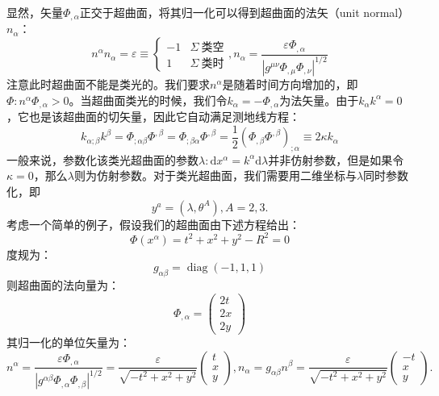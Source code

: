 \documentclass[hyperref, UTF8, a4paper]{ctexart}
\begin{document}
显然，矢量$\Phi _{,\alpha }$正交于超曲面，将其归一化可以得到超曲面的法矢（unit normal）$n_{\alpha }$：
\begin{equation*}
	n^{\alpha } n_{\alpha } =\varepsilon \equiv \begin{cases}
		-1 & \Sigma \ \text{类空}\\
		1 & \Sigma \ \text{类时}
	\end{cases} ,n_{\alpha } =\frac{\varepsilon \Phi _{,\alpha }}{\left| g^{\mu \nu } \Phi _{,\mu } \Phi _{,\nu }\right| ^{1/2}}
\end{equation*}
注意此时超曲面不能是类光的。我们要求$n^{\alpha }$是随着时间方向增加的，即$\displaystyle \Phi :n^{\alpha } \Phi _{,\alpha }  >0$。当超曲面类光的时候，我们令$k_{\alpha } =-\Phi _{,\alpha }$为法矢量。由于$k_{\alpha } k^{\alpha } =0$，它也是该超曲面的切矢量，因此它自动满足测地线方程：
\begin{equation*}
	k_{\alpha ;\beta } k^{\beta } =\Phi _{;\alpha \beta } \Phi ^{,\beta } =\Phi _{;\beta \alpha } \Phi ^{,\beta } =\frac{1}{2} (\Phi _{,\beta } \Phi ^{,\beta } )_{;\alpha } \equiv 2\kappa k_{\alpha }
\end{equation*}
一般来说，参数化该类光超曲面的参数$\lambda :\mathrm{d} x^{\alpha } =k^{\alpha }\mathrm{d} \lambda $并非仿射参数，但是如果令$\kappa =0$，那么$\lambda $则为仿射参数。对于类光超曲面，我们需要用二维坐标与$\lambda $同时参数化，即
\begin{equation*}
	y^{a} =(\lambda ,\theta ^{A} ),A=2,3.
\end{equation*}
考虑一个简单的例子，假设我们的超曲面由下述方程给出：
\begin{equation*}
	\Phi (x^{\alpha } )=t^{2} +x^{2} +y^{2} -R^{2} =0
\end{equation*}
度规为：
\begin{equation*}
	g_{\alpha \beta } =\operatorname{diag}( -1,1,1)
\end{equation*}
则超曲面的法向量为：
\begin{equation*}
	\Phi _{,\alpha } =\begin{pmatrix}
		2t\\
		2x\\
		2y
	\end{pmatrix}
\end{equation*}
其归一化的单位矢量为：
\begin{equation*}
	n^{\alpha } =\frac{\varepsilon \Phi _{,\alpha }}{\left| g^{\alpha \beta } \Phi _{,\alpha } \Phi _{,\beta }\right| ^{1/2}} =\frac{\varepsilon }{\sqrt{-t^{2} +x^{2} +y^{2}}}\begin{pmatrix}
		t\\
		x\\
		y
	\end{pmatrix} ,n_{\alpha } =g_{\alpha \beta } n^{\beta } =\frac{\varepsilon }{\sqrt{-t^{2} +x^{2} +y^{2}}}\begin{pmatrix}
		-t\\
		x\\
		y
	\end{pmatrix} .
\end{equation*}
\end{document}
